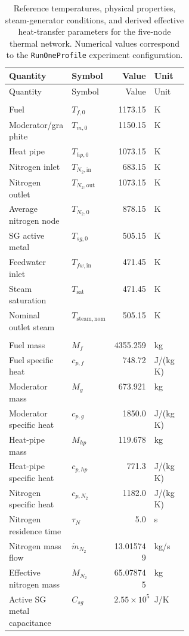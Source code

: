 \begingroup
\small
\setlength{\tabcolsep}{3.5pt}
\begin{longtable}{@{}p{0.35\linewidth}lrl@{}}
\caption{Reference temperatures, physical properties, steam-generator conditions, and derived effective heat-transfer parameters for the five-node thermal network. Numerical values correspond to the \texttt{RunOneProfile} experiment configuration.}
\label{tab:plant-thermal}\\
\toprule
Quantity & Symbol & Value & Unit\\
\midrule
\endfirsthead
\toprule
Quantity & Symbol & Value & Unit\\
\midrule
\endhead
\bottomrule
\endfoot

\multicolumn{4}{@{}l}{\textbf{Reference temperatures}}\\
Fuel & $T_{f,0}$ & 1173.15 & K\\
Moderator/graphite & $T_{m,0}$ & 1150.15 & K\\
Heat pipe & $T_{hp,0}$ & 1073.15 & K\\
Nitrogen inlet & $T_{N_2,\mathrm{in}}$ & 683.15 & K\\
Nitrogen outlet & $T_{N_2,\mathrm{out}}$ & 1073.15 & K\\
Average nitrogen node & $T_{N_2,0}$ & 878.15 & K\\
SG active metal & $T_{sg,0}$ & 505.15 & K\\
Feedwater inlet & $T_{fw,\mathrm{in}}$ & 471.45 & K\\
Steam saturation & $T_{\mathrm{sat}}$ & 471.45 & K\\
Nominal outlet steam & $T_{\mathrm{steam,nom}}$ & 505.15 & K\\

\addlinespace
\multicolumn{4}{@{}l}{\textbf{Thermal lump properties}}\\
Fuel mass & $M_f$ & 4355.259 & kg\\
Fuel specific heat & $c_{p,f}$ & 748.72 & J/(kg K)\\
Moderator mass & $M_g$ & 673.921 & kg\\
Moderator specific heat & $c_{p,g}$ & 1850.0 & J/(kg K)\\
Heat-pipe mass & $M_{hp}$ & 119.678 & kg\\
Heat-pipe specific heat & $c_{p,hp}$ & 771.3 & J/(kg K)\\
Nitrogen specific heat & $c_{p,N_2}$ & 1182.0 & J/(kg K)\\
Nitrogen residence time & $\tau_N$ & 5.0 & s\\
Nitrogen mass flow & $\dot m_{N_2}$ & 13.015749 & kg/s\\
Effective nitrogen mass & $M_{N_2}$ & 65.078745 & kg\\
Active SG metal capacitance & $C_{sg}$ & $2.55\times10^5$ & J/K\\


\end{longtable}
